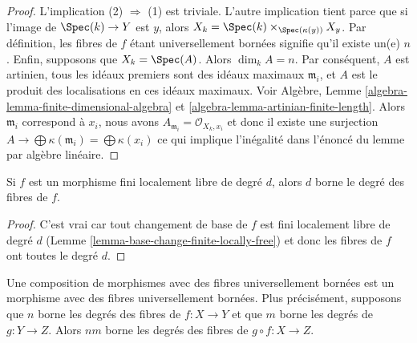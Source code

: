 \begin{proof}
L'implication (2) $\Rightarrow$ (1) est triviale. L'autre implication
tient parce que si l'image de $\Spec(k) \to Y$ est $y$,
alors $X_k = \Spec(k) \times_{\Spec(\kappa(y))} X_y$. Par définition, les fibres de $f$
étant universellement bornées signifie qu'il existe
un(e) $n$. Enfin, supposons que $X_k = \Spec(A)$.
Alors $\dim_k A = n$. Par conséquent, $A$ est artinien, tous les
idéaux premiers sont des idéaux maximaux $\mathfrak m_i$, et $A$
est le produit des localisations en ces idéaux maximaux.
Voir Algèbre, Lemme \ref{algebra-lemma-finite-dimensional-algebra} et \ref{algebra-lemma-artinian-finite-length}. Alors
$\mathfrak m_i$ correspond à $x_i$,
nous avons $A_{\mathfrak m_i} = \mathcal{O}_{X_k, x_i}$ et donc
il existe une surjection
$A \to  \bigoplus \kappa(\mathfrak m_i) = \bigoplus \kappa(x_i)$ ce qui implique l'inégalité
dans l'énoncé du lemme par algèbre
linéaire.
\end{proof}

\begin{lemma}
\label{lemma-finite-locally-free-universally-bounded}
Si $f$ est un morphisme fini localement libre de degré $d$, alors
$d$ borne le degré des fibres de $f$.
\end{lemma}

\begin{proof}
C'est vrai car tout changement de base de $f$
est fini localement libre de
degré $d$ (Lemme \ref{lemma-base-change-finite-locally-free}) et donc les fibres
de $f$ ont toutes le degré $d$.
\end{proof}

\begin{lemma}
\label{lemma-composition-universally-bounded}
Une composition de morphismes avec des fibres universellement bornées
est un morphisme avec des fibres universellement bornées. Plus
précisément, supposons que $n$ borne les degrés des fibres de $f : X \to Y$
et que $m$ borne les degrés de
$g : Y \to Z$. Alors $nm$ borne les degrés des fibres de $g \circ f : X \to Z$.
\end{lemma}

